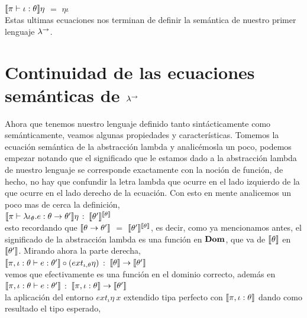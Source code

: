 \

$\llbracket \pi \vdash \iota : \theta \rrbracket\eta$ $=$ $\eta \iota$\\

Estas ultimas ecuaciones nos terminan de definir la sem\'antica de nuestro 
primer lenguaje $\lambda^{\rightarrow}$.

\section{Continuidad de las ecuaciones sem\'anticas de $\lambda^{\rightarrow}$}

Ahora que tenemos nuestro lenguaje definido tanto sint\'acticamente como
sem\'anticamente, veamos algunas propiedades y caracter\'isticas. Tomemos
la ecuaci\'on sem\'antica de la abstracci\'on lambda y analic\'emosla un 
poco, podemos empezar notando que el significado que le estamos dado
a la abstracci\'on lambda de nuestro lenguaje se corresponde exactamente
con la noci\'on de funci\'on, de hecho, no hay que confundir la letra lambda
que ocurre en el lado izquierdo de la que ocurre en el lado derecho de la
ecuaci\'on. Con esto en mente analicemos un poco mas de cerca la definici\'on,\\

$\llbracket \pi \vdash \lambda \iota_{\theta} . e : \theta \rightarrow \theta' \rrbracket\eta$ $:$
$\llbracket \theta' \rrbracket^{\llbracket \theta \rrbracket}$\\

\noindent
esto recordando que $\llbracket \theta \rightarrow \theta' \rrbracket$ $=$ $\llbracket \theta' \rrbracket^{\llbracket \theta \rrbracket}$,
es decir, como ya mencionamos antes, el significado de la abstracci\'on lambda es
una funci\'on en $\textbf{Dom}$, que va de $\llbracket \theta \rrbracket$ en $\llbracket \theta' \rrbracket$. Mirando
ahora la parte derecha,\\

$\llbracket \pi,\iota:\theta \vdash e : \theta' \rrbracket  \circ (ext_{\iota,\theta} \eta) $ $:$
	$\llbracket \theta \rrbracket \rightarrow \llbracket \theta' \rrbracket$\\

\noindent
vemos que efectivamente es una funci\'on en el dominio correcto, adem\'as en\\

$\llbracket \pi,\iota:\theta \vdash e : \theta' \rrbracket$ $:$ 
								$\llbracket \pi,\iota:\theta \rrbracket \rightarrow \llbracket \theta' \rrbracket$\\

\noindent
la aplicaci\'on del entorno $ext_\iota \eta \ x$ extendido tipa perfecto 
con $\llbracket \pi,\iota:\theta \rrbracket$ dando como resultado el tipo esperado,\\

